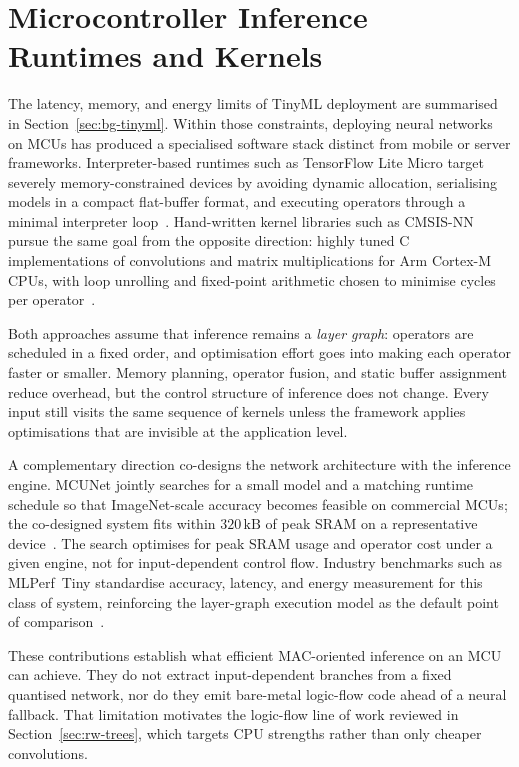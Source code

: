 \section{Microcontroller Inference Runtimes and Kernels}
\label{sec:rw-tinyml}

The latency, memory, and energy limits of TinyML deployment are summarised in Section~\ref{sec:bg-tinyml}.
Within those constraints, deploying neural networks on \acp{MCU} has produced a specialised software stack distinct from mobile or server frameworks.
Interpreter-based runtimes such as TensorFlow Lite Micro target severely memory-constrained devices by avoiding dynamic allocation, serialising models in a compact flat-buffer format, and executing operators through a minimal interpreter loop~\cite{david2021tflite}.
Hand-written kernel libraries such as CMSIS-NN pursue the same goal from the opposite direction: highly tuned C implementations of convolutions and matrix multiplications for Arm Cortex-M \acp{CPU}, with loop unrolling and fixed-point arithmetic chosen to minimise cycles per operator~\cite{lai2018cmsisnn}.

Both approaches assume that inference remains a \emph{layer graph}: operators are scheduled in a fixed order, and optimisation effort goes into making each operator faster or smaller.
Memory planning, operator fusion, and static buffer assignment reduce overhead, but the control structure of inference does not change.
Every input still visits the same sequence of kernels unless the framework applies optimisations that are invisible at the application level.

A complementary direction co-designs the network architecture with the inference engine.
MCUNet jointly searches for a small model and a matching runtime schedule so that ImageNet-scale accuracy becomes feasible on commercial \acp{MCU}; the co-designed system fits within \(320\,\mathrm{kB}\) of peak \ac{SRAM} on a representative device~\cite{lin2020mcunet}.
The search optimises for peak \ac{SRAM} usage and operator cost under a given engine, not for input-dependent control flow.
Industry benchmarks such as MLPerf~Tiny standardise accuracy, latency, and energy measurement for this class of system, reinforcing the layer-graph execution model as the default point of comparison~\cite{banbury2021mlperftiny}.

These contributions establish what efficient \ac{MAC}-oriented inference on an \ac{MCU} can achieve.
They do not extract input-dependent branches from a fixed quantised network, nor do they emit bare-metal logic-flow code ahead of a neural fallback.
That limitation motivates the logic-flow line of work reviewed in Section~\ref{sec:rw-trees}, which targets \ac{CPU} strengths rather than only cheaper convolutions.


